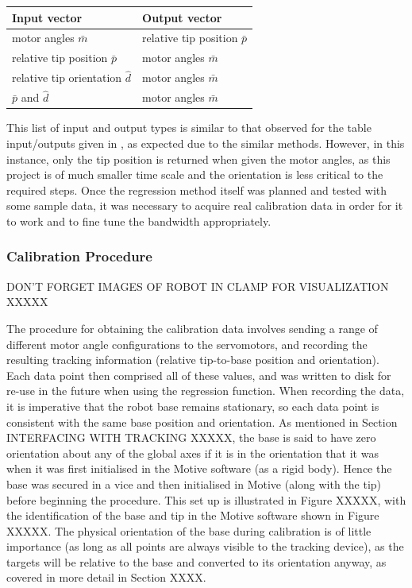\documentclass[11pt]{article}
\begin{document}
\begin{center}
\label{table:regressionOutputs}
\begin{tabularx}{0.66\textwidth}{ | >{\centering\arraybackslash}p{12em} |>{\centering\arraybackslash}X|} 
\hline
Input vector & Output vector\\
\hline
motor angles $\bar{m}$ & relative tip position $\bar{p}$ \\
relative tip position $\bar{p}$ & motor angles $\bar{m}$ \\
relative tip orientation $\hat{d}$ & motor angles $\bar{m}$ \\
$\bar{p}$ and $\hat{d}$ & motor angles $\bar{m}$\\
\hline
\end{tabularx}
\end{center}

This list of input and output types is similar to that observed for the table input/outputs given in \cite{GreggSmithDesign}, as expected due to the similar methods. However, in this instance, only the tip position is returned when given the motor angles, as this project is of much smaller time scale and the orientation is less critical to the required steps. Once the regression method itself was planned and tested with some sample data, it was necessary to acquire real calibration data in order for it to work and to fine tune the bandwidth appropriately.


\subsubsection{Calibration Procedure}
DON'T FORGET IMAGES OF ROBOT IN CLAMP FOR VISUALIZATION XXXXX

The procedure for obtaining the calibration data involves sending a range of different motor angle configurations to the servomotors, and recording the resulting tracking information (relative tip-to-base position and orientation). Each data point then comprised all of these values, and was written to disk for re-use in the future when using the regression function. When recording the data, it is imperative that the robot base remains stationary, so each data point is consistent with the same base position and orientation. As mentioned in Section INTERFACING WITH TRACKING XXXXX, the base is said to have zero orientation about any of the global axes if it is in the orientation that it was when it was first initialised in the Motive software (as a rigid body). Hence the base was secured in a vice and then initialised in Motive (along with the tip) before beginning the procedure. This set up is illustrated in Figure XXXXX, with the identification of the base and tip in the Motive software shown in Figure XXXXX. The physical orientation of the base during calibration is of little importance (as long as all points are always visible to the tracking device), as the targets will be relative to the base and converted to its orientation anyway, as covered in more detail in Section XXXX.
\end{document}
